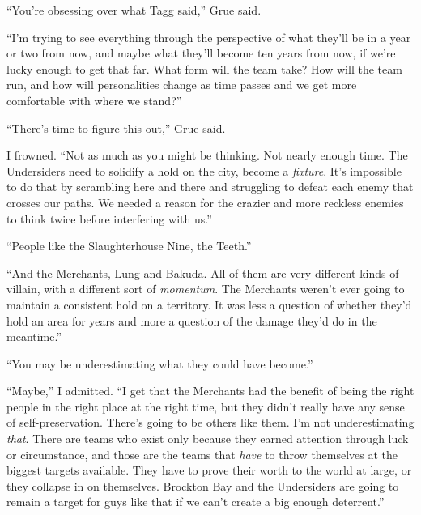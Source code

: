 ``You're obsessing over what Tagg said,'' Grue said.



``I'm trying to see everything through the perspective of what they'll be in a year or two from now, and maybe what they'll become ten years from now, if we're lucky enough to get that far.  What form will the team take?  How will the team run, and how will personalities change as time passes and we get more comfortable with where we stand?''



``There's time to figure this out,'' Grue said.



I frowned.  ``Not as much as you might be thinking.  Not nearly enough time.  The Undersiders need to solidify a hold on the city, become a \emph{fixture}.  It's impossible to do that by scrambling here and there and struggling to defeat each enemy that crosses our paths.  We needed a reason for the crazier and more reckless enemies to think twice before interfering with us.''



``People like the Slaughterhouse Nine, the Teeth.''



``And the Merchants, Lung and Bakuda.  All of them are very different kinds of villain, with a different sort of \emph{momentum}.  The Merchants weren't ever going to maintain a consistent hold on a territory.  It was less a question of whether they'd hold an area for years and more a question of the damage they'd do in the meantime.''



``You may be underestimating what they could have become.''



``Maybe,'' I admitted.  ``I get that the Merchants had the benefit of being the right people in the right place at the right time, but they didn't really have any sense of self-preservation.  There's going to be others like them.  I'm not underestimating \emph{that}.  There are teams who exist only because they earned attention through luck or circumstance, and those are the teams that \emph{have }to throw themselves at the biggest targets available.  They have to prove their worth to the world at large, or they collapse in on themselves.  Brockton Bay and the Undersiders are going to remain a target for guys like that if we can't create a big enough deterrent.''



